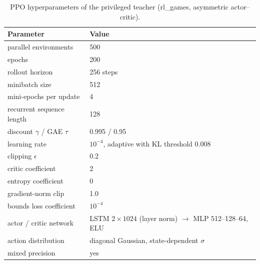 \begin{table}[!htbp]%
    \centering%
    \caption{\acs{PPO} hyperparameters of the privileged teacher (rl\_games, asymmetric actor--critic).}%
    \label{tab:ppo}%
    \small
    \begin{tabular}{ll}
        \toprule
        Parameter & Value \\
        \midrule
        parallel environments & 500 \\
        epochs & 200 \\
        rollout horizon & 256 steps \\
        minibatch size & 512 \\
        mini-epochs per update & 4 \\
        recurrent sequence length & 128 \\
        discount $\gamma$ / GAE $\tau$ & 0.995 / 0.95 \\
        learning rate & $10^{-4}$, adaptive with KL threshold 0.008 \\
        clipping $\epsilon$ & 0.2 \\
        critic coefficient & 2 \\
        entropy coefficient & 0 \\
        gradient-norm clip & 1.0 \\
        bounds loss coefficient & $10^{-4}$ \\
        actor / critic network & \ac{LSTM} $2\times1024$ (layer norm) $\rightarrow$ \acs{MLP} 512--128--64, ELU \\
        action distribution & diagonal Gaussian, state-dependent $\sigma$ \\
        mixed precision & yes \\
        \bottomrule
    \end{tabular}
\end{table}%

